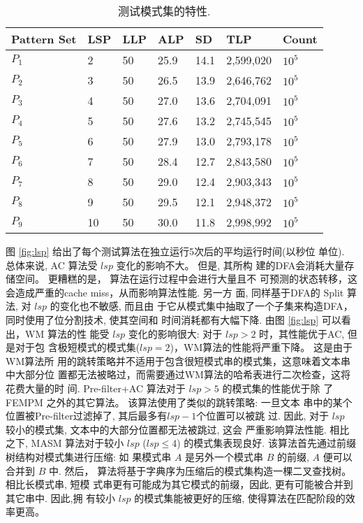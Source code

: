 \documentclass{ws-ijprai}
\begin{document}
\begin{table}
  \centering
  \caption{测试模式集的特性.}
  \scriptsize
  \label{tab:lsps}
  \begin{tabular}{p{20pt}p{10pt}p{10pt}p{10pt}p{10pt}p{30pt}p{20pt}}
    \hline
    Pattern Set & LSP  & LLP  & ALP & SD & TLP & Count\\
    \hline
    $P_1$ & 2 & 50 & 25.9 & 14.1 & 2,599,020 & $10^5$\\
    $P_2$ & 3 & 50 & 26.5 & 13.9 & 2,646,762 & $10^5$\\
    $P_3$ & 4 & 50 & 27.0 & 13.6 & 2,704,091 & $10^5$\\
    $P_4$ & 5 & 50 & 27.6 & 13.2 & 2,745,545 & $10^5$\\
    $P_5$ & 6 & 50 & 27.9 & 13.0 & 2,793,178 & $10^5$\\
    $P_6$ & 7 & 50 & 28.4 & 12.7 & 2,843,580 & $10^5$\\
    $P_7$ & 8 & 50 & 29.0 & 12.4 & 2,903,343 & $10^5$\\
    $P_8$ & 9 & 50 & 29.5 & 12.1 & 2,948,372 & $10^5$\\
    $P_9$ &10 & 50 & 30.0 & 11.8 & 2,998,992 & $10^5$\\
    \hline
  \end{tabular}
\end{table}


图 \ref{fig:lsp} 给出了每个测试算法在独立运行5次后的平均运行时间(以秒位
单位). 总体来说, \textsf{AC} 算法受 $lsp$ 变化的影响不大。 但是, 其所构
建的DFA会消耗大量存储空间。 更糟糕的是， 算法在运行过程中会进行大量且不
可预测的状态转移，这会造成严重的cache miss，从而影响算法性能. 另一方
面, 同样基于DFA的 \textsf{Split} 算法, 对 $lsp$ 的变化也不敏感, 而且由
于它从模式集中抽取了一个子集来构造DFA，同时使用了位分割技术, 使其空间和
时间消耗都有大幅下降. 由图 \ref{fig:lsp} 可以看出，\textsf{WM} 算法的性
能受 $lsp$ 变化的影响很大: 对于 $lsp > 2$ 时，其性能优于AC, 但是对于包
含极短模式的模式集($lsp=2$)，WM算法的性能将严重下降。 这是由于WM算法所
用的跳转策略并不适用于包含很短模式串的模式集，这意味着文本串中大部分位
置都无法被略过，而需要通过WM算法的哈希表进行二次检查，这将花费大量的时
间.  \textsf{Pre-filter+AC} 算法对于 $lsp > 5$ 的模式集的性能优于除
了 \textsf{FEMPM} 之外的其它算法。 该算法使用了类似的跳转策略: 一旦文本
串中的某个位置被Pre-filter过滤掉了, 其后最多有$lsp-1$个位置可以被跳
过. 因此, 对于 $lsp$ 较小的模式集, 文本中的大部分位置都无法被跳过, 这会
严重影响算法性能. 相比之下, \textsf{MASM} 算法对于较小 $lsp$ ($lsp
\leq 4$) 的模式集表现良好. 该算法首先通过前缀树结构对模式集进行压缩: 如
果模式串 $A$ 是另外一个模式串 $B$ 的前缀, $A$ 便可以合并到 $B$ 中. 然后，
算法将基于字典序为压缩后的模式集构造一棵二叉查找树。 相比长模式串, 短模
式串更有可能成为其它模式的前缀，因此, 更有可能被合并到其它串中. 因此,拥
有较小 $lsp$ 的模式集能被更好的压缩, 使得算法在匹配阶段的效率更高。
\end{document}
